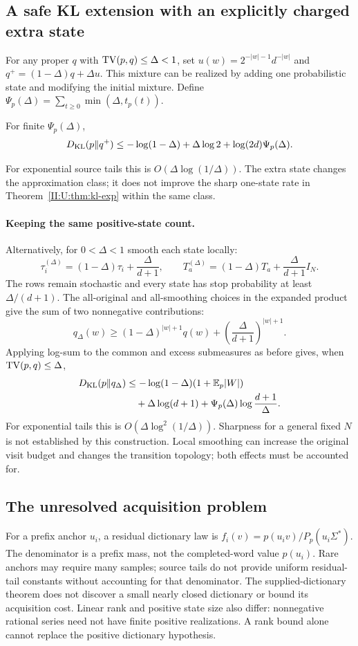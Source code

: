 \subsection{A safe KL extension with an explicitly charged extra state}\label{II:U:sec:flow-smoothing}
For any proper $q$ with $\operatorname{TV}(p,q)\le\Delta<1$, set
$u(w)=2^{-|w|-1}d^{-|w|}$ and
$q^+=(1-\Delta)q+\Delta u$. This mixture can be realized by adding
one probabilistic state and modifying the initial mixture. Define
$\Psi_p(\Delta)=\sum_{t\ge0}\min(\Delta,t_p(t))$.
\begin{proposition}
For finite $\Psi_p(\Delta)$,
\[
 D_{\rm KL}(p\|q^+)\le-\log(1-\Delta)+\Delta\log2
                            +\log(2d)\Psi_p(\Delta).
\]
\end{proposition}

For exponential source tails this is $O(\Delta\log(1/\Delta))$.
The extra state changes the approximation class; it does not improve the
sharp one-state rate in Theorem~\ref{II:U:thm:kl-exp} within the same class.

\paragraph{Keeping the same positive-state count.}
Alternatively, for $0<\Delta<1$ smooth each state locally:
\[
 \tau_i^{(\Delta)}=(1-\Delta)\tau_i+\frac\Delta{d+1},\qquad
 T_a^{(\Delta)}=(1-\Delta)T_a+\frac\Delta{d+1}I_N.
\]
The rows remain stochastic and every state has stop probability at least
$\Delta/(d+1)$. The all-original and all-smoothing choices in the expanded
product give the sum of two nonnegative contributions:
\[
 q_\Delta(w)\ge(1-\Delta)^{|w|+1}q(w)
                   +\left(\frac\Delta{d+1}\right)^{|w|+1}.
\]
Applying log-sum to the common and excess submeasures as before gives,
when $\operatorname{TV}(p,q)\le\Delta$,
\begin{align*}
 D_{\rm KL}(p\|q_\Delta)
 &\le-\log(1-\Delta)(1+\mathbb E_p|W|)\\
 &\quad+\Delta\log(d+1)+\Psi_p(\Delta)\log\frac{d+1}{\Delta}.
\end{align*}
For exponential tails this is $O(\Delta\log^2(1/\Delta))$.
Sharpness for a general fixed $N$ is not established by this construction.
Local smoothing can increase the original visit budget and changes the
transition topology; both effects must be accounted for.

\subsection{The unresolved acquisition problem}\label{II:U:sec:acquisition-obstruction}
For a prefix anchor $u_i$, a residual dictionary law is
$f_i(v)=p(u_iv)/P_p(u_i\Sigma^*)$. The denominator is a prefix mass,
not the completed-word value $p(u_i)$. Rare anchors may require many
samples; source tails do not provide uniform residual-tail constants
without accounting for that denominator. The supplied-dictionary theorem
does not discover a small nearly closed dictionary or bound its acquisition
cost. Linear rank and positive state size also differ: nonnegative rational
series need not have finite positive realizations. A rank bound alone cannot
replace the positive dictionary hypothesis.

